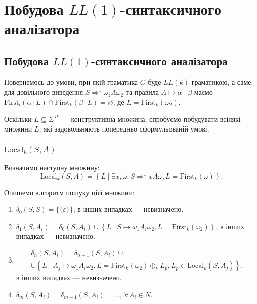 \setcounter{section}{11}

\section{Побудова \texorpdfstring{$LL(1)$}{LLk}-синтаксичного аналізатора}

\subsection{Побудова \texorpdfstring{$LL(1)$}{LLk}-синтаксичного аналізатора}

Повернемось до умови, при якій граматика $G$ буде $LL(k)$-граматикою, а саме: для довільного виведення $S \Rightarrow^\star \omega_1 A \omega_2$ та правила $A \mapsto \alpha \mid \beta$ маємо $\text{First}_l(\alpha \cdot L) \cap \text{First}_k(\beta \cdot L) = \varnothing$, де $L = \text{First}_k(\omega_2)$. \medskip

Оскільки $L \subseteq \Sigma^{\star k}$ --- конструктивна множина, спробуємо побудувати всілякі множини $L$, які задовольняють попередньо сформульованій умові.

\subsubsection{\texorpdfstring{$\text{Local}_k(S, A)$}{LocalkSA}}

Визначимо наступну множину:
\begin{equation}
	\text{Local}_k(S, A) = \left\{ L \mid \exists x, \omega: S \Rightarrow^\star xA\omega, L = \text{First}_k(\omega) \right\}.
\end{equation}

Опишемо алгоритм пошуку цієї множини:
\begin{enumerate}
\item $\delta_0(S, S) = \{\{\varepsilon\}\}$, в інших випадках --- невизначено.
\item $\delta_1(S, A_i) = \delta_0(S, A_i) \cup \left\{ L \mid S \mapsto \omega_1 A_i \omega_2, L = \text{First}_k (\omega_2) \right\}$, в інших випадках --- невизначено.
\item 
\begin{multline*}
	\delta_n(S, A_i) = \delta_{n - 1}(S, A_i) \cup \\
	\cup \left\{ L \mid A_j \mapsto \omega_1 A_i \omega_2, L = \text{First}_k (\omega_2) \oplus_k L_p, L_p \in \text{Local}_k(S, A_j) \right\},
\end{multline*}
в інших випадках --- невизначено.
\item $\delta_m(S, A_i) = \delta_{m + 1}(S, A_i) = \ldots$, $\forall A_i \in N$.
\end{enumerate}

